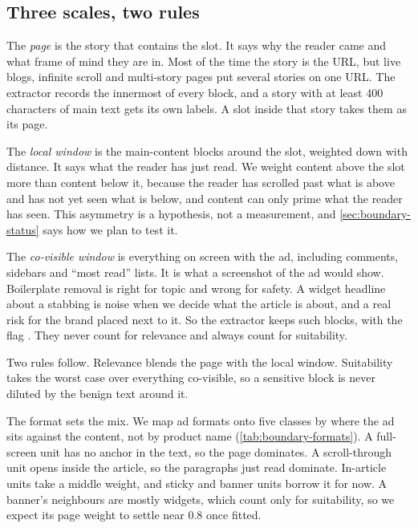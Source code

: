 \subsection{Three scales, two rules}\label{sec:boundary-scales}

The \emph{page} is the story that contains the slot. It says why the reader came
and what frame of mind they are in. Most of the time the story is the URL, but
live blogs, infinite scroll and multi-story pages put several stories on one
URL. The extractor records the innermost  of every block, and a
story with at least 400 characters of main text gets its own labels. A slot
inside that story takes them as its page.

The \emph{local window} is the main-content blocks around the slot, weighted
down with distance. It says what the reader has just read. We weight content
above the slot more than content below it, because the reader has scrolled
past what is above and has not yet seen what is below, and content can only
prime what the reader has seen. This asymmetry is a hypothesis, not a
measurement, and \cref{sec:boundary-status} says how we plan to test it.

The \emph{co-visible window} is everything on screen with the ad, including
comments, sidebars and ``most read'' lists. It is what a screenshot of the ad
would show. Boilerplate removal is right for topic and wrong for safety. A
widget headline about a stabbing is noise when we decide what the article is
about, and a real risk for the brand placed next to it. So the extractor keeps
such blocks, with the flag . They never count for relevance
and always count for suitability.

Two rules follow. Relevance blends the page with the local window. Suitability
takes the worst case over everything co-visible, so a sensitive block is never diluted
by the benign text around it.

The format sets the mix. We map ad formats onto five classes by where the ad
sits against the content, not by product name (\cref{tab:boundary-formats}).
A full-screen unit has no anchor in the text, so the page dominates. A
scroll-through unit opens inside the article, so the paragraphs just read
dominate. In-article units take a middle weight, and sticky and banner units
borrow it for now. A banner's neighbours are mostly widgets, which count only
for suitability, so we expect its page weight to settle near 0.8 once fitted.

